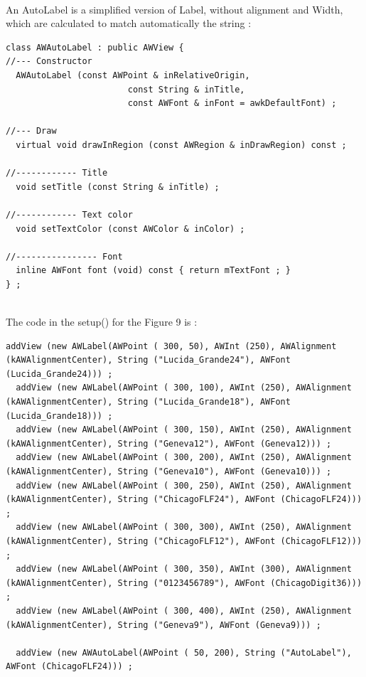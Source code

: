 \documentclass[a4paper,11pt]{extarticle}
\begin{document}
~\\ An AutoLabel is a simplified version of Label, without alignment and Width, which are calculated to match automatically the string :

\begin{lstlisting}[language=Arduinonl]
class AWAutoLabel : public AWView {
//--- Constructor
  AWAutoLabel (const AWPoint & inRelativeOrigin,
                        const String & inTitle,
                        const AWFont & inFont = awkDefaultFont) ;

//--- Draw
  virtual void drawInRegion (const AWRegion & inDrawRegion) const ;

//------------ Title
  void setTitle (const String & inTitle) ;

//------------ Text color
  void setTextColor (const AWColor & inColor) ;

//---------------- Font
  inline AWFont font (void) const { return mTextFont ; }
} ;
\end{lstlisting}

~\\ The code in the setup() for the Figure 9 is :

\begin{lstlisting}[language=Arduinonl]
  addView (new AWLabel(AWPoint ( 300, 50), AWInt (250), AWAlignment (kAWAlignmentCenter), String ("Lucida_Grande24"), AWFont (Lucida_Grande24))) ;
  addView (new AWLabel(AWPoint ( 300, 100), AWInt (250), AWAlignment (kAWAlignmentCenter), String ("Lucida_Grande18"), AWFont (Lucida_Grande18))) ;
  addView (new AWLabel(AWPoint ( 300, 150), AWInt (250), AWAlignment (kAWAlignmentCenter), String ("Geneva12"), AWFont (Geneva12))) ;
  addView (new AWLabel(AWPoint ( 300, 200), AWInt (250), AWAlignment (kAWAlignmentCenter), String ("Geneva10"), AWFont (Geneva10))) ;
  addView (new AWLabel(AWPoint ( 300, 250), AWInt (250), AWAlignment (kAWAlignmentCenter), String ("ChicagoFLF24"), AWFont (ChicagoFLF24))) ;
  addView (new AWLabel(AWPoint ( 300, 300), AWInt (250), AWAlignment (kAWAlignmentCenter), String ("ChicagoFLF12"), AWFont (ChicagoFLF12))) ;
  addView (new AWLabel(AWPoint ( 300, 350), AWInt (300), AWAlignment (kAWAlignmentCenter), String ("0123456789"), AWFont (ChicagoDigit36))) ;
  addView (new AWLabel(AWPoint ( 300, 400), AWInt (250), AWAlignment (kAWAlignmentCenter), String ("Geneva9"), AWFont (Geneva9))) ;

  addView (new AWAutoLabel(AWPoint ( 50, 200), String ("AutoLabel"), AWFont (ChicagoFLF24))) ;
\end{lstlisting}
\end{document}
